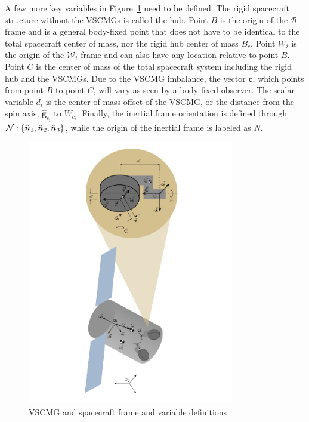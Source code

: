 A few more key variables in Figure~\ref{fig:scplusVSCMG} need to be defined. The rigid spacecraft structure without the VSCMGs is called the hub.  Point $B$ is the origin of the $\mathcal{B}$ frame and is a general body-fixed point that does not have to be identical to the total spacecraft center of mass, nor the rigid hub center of mass $B_{c}$. Point $W_i$ is the origin of the $\mathcal{W}_i$ frame and can also have any location relative to point $B$. Point $C$ is the center of mass of the total spacecraft system including the rigid hub and the VSCMGs. Due to the VSCMG imbalance, the vector $\bm c$, which points from point $B$ to point $C$, will vary as seen by a body-fixed observer. The scalar variable $d_i$ is the center of mass offset of the VSCMG, or the distance from the spin axis, $\hat{\bm g}_{\text{s}_i}$ to $W_{c_i}$.  Finally, the inertial frame orientation is defined through $\frameDefinition{N}$, while the origin of the inertial frame is labeled as $N$.

\begin{figure}[htbp]
	\centerline{
		\includegraphics[angle=-90,width=0.8\textwidth]{Figures/scplusVSCMG}}
	\caption{VSCMG and spacecraft frame and variable definitions}
	\label{fig:scplusVSCMG}
\end{figure}

